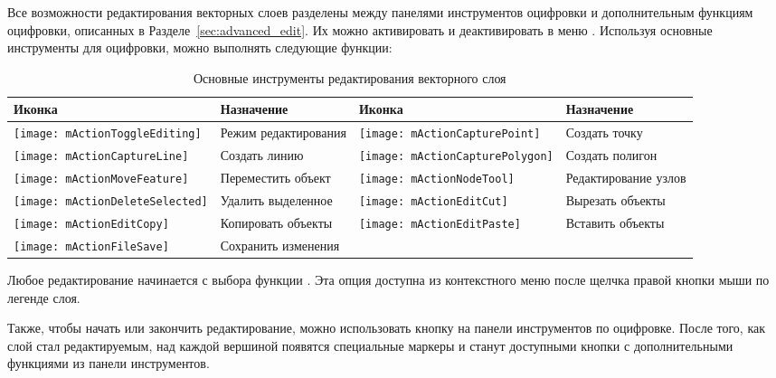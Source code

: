 Все возможности редактирования векторных слоев разделены между панелями
инструментов оцифровки и дополнительным функциям оцифровки, описанных в
Разделе~\ref{sec:advanced_edit}. Их можно активировать и деактивировать
в меню  \arrow {}.
Используя основные инструменты для оцифровки, можно выполнять следующие
функции:

\begin{table}[ht]
\centering
\begin{tabular}{|l|p{5.5cm}|l|p{5.5cm}|}
\hline \textbf{Иконка} & \textbf{Назначение} & \textbf{Иконка} & \textbf{Назначение} \\
\hline \texttt{[image: mActionToggleEditing]}
   & Режим редактирования
   & \texttt{[image: mActionCapturePoint]}
   & Создать точку \\
\hline \texttt{[image: mActionCaptureLine]}
   & Создать линию
   & \texttt{[image: mActionCapturePolygon]}
   & Создать полигон \\
\hline \texttt{[image: mActionMoveFeature]}
   & Переместить объект
   & \texttt{[image: mActionNodeTool]}
   & Редактирование узлов \\
\hline \texttt{[image: mActionDeleteSelected]}
   & Удалить выделенное
   & \texttt{[image: mActionEditCut]}
   & Вырезать объекты \\
\hline \texttt{[image: mActionEditCopy]}
   & Копировать объекты
   & \texttt{[image: mActionEditPaste]}
   & Вставить объекты \\
\hline \texttt{[image: mActionFileSave]}
   & Сохранить изменения
   &  &  \\
\hline
\end{tabular}
\caption{Основные инструменты редактирования векторного слоя}\label{tab:vector_editing}\medskip
\end{table}

Любое редактирование начинается с выбора функции
.
Эта опция доступна из контекстного меню после щелчка правой кнопки мыши
по легенде слоя.

Также, чтобы начать или закончить редактирование, можно использовать
кнопку 
 на панели инструментов
по оцифровке. После того, как слой стал редактируемым,
над каждой вершиной появятся специальные маркеры и станут доступными кнопки
с дополнительными функциями из панели инструментов.


